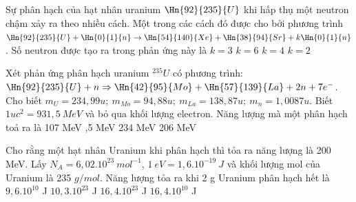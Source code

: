 \begin{vidu}%
Sự phân hạch của hạt nhân uranium $\Hn{92}{235}{U}$ khi hấp thụ một neutron chậm xảy ra theo nhiều cách. Một trong các cách đó được cho bởi phương trình $\Hn{92}{235}{U}+\Hn{0}{1}{n}\to  \Hn{54}{140}{Xe}+\Hn{38}{94}{Sr}+k\Hn{0}{1}{n}$. Số neutron được tạo ra trong phản ứng này là
\choice
{$k = 3$}
{$k = 6$}
{$k = 4$}
{\True $k = 2$}
\end{vidu}
\begin{vidu}%
Xét phản ứng phân hạch uranium $^{235}U$ có phương trình: $\Hn{92}{235}{U}+n\Rightarrow \Hn{42}{95}{Mo}+\Hn{57}{139}{La}+2n+7e^-$. Cho biết
${m_U}=234,99u;\ m_{Mo}=94,88u;\ m_{La}=138,87u;\ {m_n}=1,0087u$. Biết $1uc^2=931,5\ MeV$ và bỏ qua khối lượng electron. Năng lượng mà một phân hạch toả ra là
\choice
{107 MeV}
{,5 MeV}
{234 MeV}
{206 MeV}
\end{vidu}
\begin{vidu}%
 Cho rằng một hạt nhân Uranium  khi phân hạch thì tỏa ra năng lượng là 200 MeV. Lấy $N_A=6,{02.10}^{23}\ mo{l}^{- 1}$, $1\ eV=1,{6.10}^{- 19}\ J$ và khối lượng mol của Uranium  là 235 $g/mol$. Năng lượng tỏa ra khi 2 g Uranium  phân hạch hết là
\choice
{$9,{6.10}^{10}$ J}
{$10,{3.10}^{23}$ J}
{$16,{4.10}^{23}$ J}
{\True $16,{4.10}^{10}$ J}
\end{vidu}
